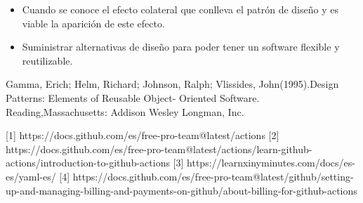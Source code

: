 \documentclass[twoside,twocolumn]{article}
\begin{document}
\begin{itemize}
\item Cuando se conoce el efecto colateral que conlleva el patrón de diseño y es viable la aparición de este efecto.
\item Suministrar alternativas de diseño para poder tener un software flexible y reutilizable.

\end{itemize}




\begin{thebibliography}{99} 

\bibitem[0]{}
\newblock Gamma, Erich; Helm, Richard; Johnson, Ralph; Vlissides, John(1995).Design Patterns: Elements of Reusable Object- Oriented Software. Reading,Massachusetts: Addison Wesley Longman, Inc.

[1] https://docs.github.com/es/free-pro-team@latest/actions
[2] https://docs.github.com/es/free-pro-team@latest/actions/learn-github-actions/introduction-to-github-actions
[3] https://learnxinyminutes.com/docs/es-es/yaml-es/
[4] https://docs.github.com/es/free-pro-team@latest/github/setting-up-and-managing-billing-and-payments-on-github/about-billing-for-github-actions
\end{thebibliography}


\end{document}
